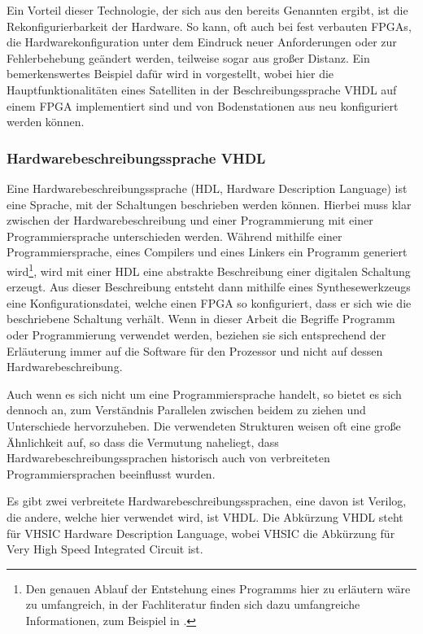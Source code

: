 \documentclass[11pt,a4paper,titlepage]{article}
\begin{document}
Ein Vorteil dieser Technologie, der sich aus den bereits Genannten ergibt, ist die Rekonfigurierbarkeit der Hardware. So kann, oft auch bei fest verbauten FPGAs, die Hardwarekonfiguration unter dem Eindruck neuer Anforderungen oder zur Fehlerbehebung geändert werden, teilweise sogar aus großer Distanz. Ein bemerkenswertes Beispiel dafür wird in \cite{Kuwahara} vorgestellt, wobei hier die Hauptfunktionalitäten eines Satelliten in der Beschreibungssprache VHDL auf einem FPGA implementiert sind und von Bodenstationen aus neu konfiguriert werden können.

\subsubsection{Hardwarebeschreibungssprache VHDL}

Eine Hardwarebeschreibungssprache (HDL, Hardware Description Language) ist eine Sprache, mit der Schaltungen beschrieben werden können. Hierbei muss klar zwischen der Hardwarebeschreibung und einer Programmierung mit einer Programmiersprache unterschieden werden. Während mithilfe einer Programmiersprache, eines Compilers und eines Linkers ein Programm generiert wird\footnote{Den genauen Ablauf der Entstehung eines Programms hier zu erläutern wäre zu umfangreich, in der Fachliteratur finden sich dazu umfangreiche Informationen, zum Beispiel in \cite{cabisz}.}, wird mit einer HDL eine abstrakte Beschreibung einer digitalen Schaltung erzeugt. Aus dieser Beschreibung entsteht dann mithilfe eines Synthesewerkzeugs eine Konfigurationsdatei, welche einen FPGA so konfiguriert, dass er sich wie die beschriebene Schaltung verhält. Wenn in dieser Arbeit die Begriffe Programm oder Programmierung verwendet werden, beziehen sie sich entsprechend der Erläuterung immer auf die Software für den Prozessor und nicht auf dessen Hardwarebeschreibung.

Auch wenn es sich nicht um eine Programmiersprache handelt, so bietet es sich dennoch an, zum Verständnis Parallelen zwischen beidem zu ziehen und Unterschiede hervorzuheben. Die verwendeten Strukturen weisen oft eine große Ähnlichkeit auf, so dass die Vermutung naheliegt, dass Hardwarebeschreibungssprachen historisch auch von verbreiteten Programmiersprachen beeinflusst wurden.

Es gibt zwei verbreitete Hardwarebeschreibungssprachen, eine davon ist Verilog, die andere, welche hier verwendet wird, ist VHDL. Die Abkürzung VHDL steht für VHSIC Hardware Description Language, wobei VHSIC die Abkürzung für Very High Speed Integrated Circuit ist.
\end{document}
